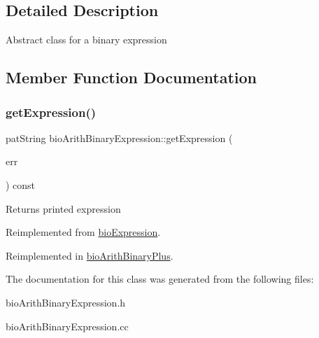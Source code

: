 \subsection{Detailed Description}
Abstract class for a binary expression 

\subsection{Member Function Documentation}
\mbox{\label{classbio_arith_binary_expression_a6c48d0f1c7b6ba1b8cf3910b9ad04f93}} 
\subsubsection{\texorpdfstring{get\+Expression()}{getExpression()}}
{\footnotesize\ttfamily pat\+String bio\+Arith\+Binary\+Expression\+::get\+Expression (\begin{DoxyParamCaption}\item[{pat\+Error $\ast$\&}]{err }\end{DoxyParamCaption}) const\hspace{0.3cm}{\ttfamily [virtual]}}

\begin{DoxyReturn}{Returns}
printed expression 
\end{DoxyReturn}


Reimplemented from \hyperlink{classbio_expression_a66a83eb0caac18dd5e568ffde5a8b5d4}{bio\+Expression}.



Reimplemented in \hyperlink{classbio_arith_binary_plus_afb38f58cc62bf6fbce4383ce40b1aecf}{bio\+Arith\+Binary\+Plus}.



The documentation for this class was generated from the following files\+:\begin{DoxyCompactItemize}
\item 
bio\+Arith\+Binary\+Expression.\+h\item 
bio\+Arith\+Binary\+Expression.\+cc\end{DoxyCompactItemize}
